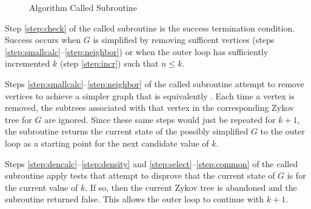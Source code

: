 \begin{figure}[h]
\begin{center}
{
    }
  \end{center}
  \caption{Algorithm Called Subroutine}
\end{figure}

Step \ref{step:check} of the called subroutine is the success termination condition.  Success occurs when \(G\) is
simplified by removing sufficent vertices (steps \ref{step:smallcalc}--\ref{step:neighbor}) or when the outer loop
has sufficiently incremented \(k\) (step \ref{step:incr}) such that \(n\le k\).

Steps \ref{step:smallcalc}--\ref{step:neighbor} of the called subroutine attempt to remove vertices to achieve a
simpler graph that is equivalently .  Each time a vertex is removed, the subtrees associated with that
vertex in the corresponding Zykov tree for \(G\) are ignored.  Since these same steps would just be repeated for
\(k+1\), the subroutine returns the current state of the possibly simplified \(G\) to the outer loop as a starting
point for the next candidate value of \(k\).

Steps \ref{step:dencalc}--\ref{step:density} and \ref{step:select}--\ref{step:common} of the called subroutine
apply tests that attempt to disprove that the current state of \(G\) is  for the current value of
\(k\).  If so, then the current Zykov tree is abandoned and the subroutine returned false.  This allows the outer
loop to continue with \(k+1\).

